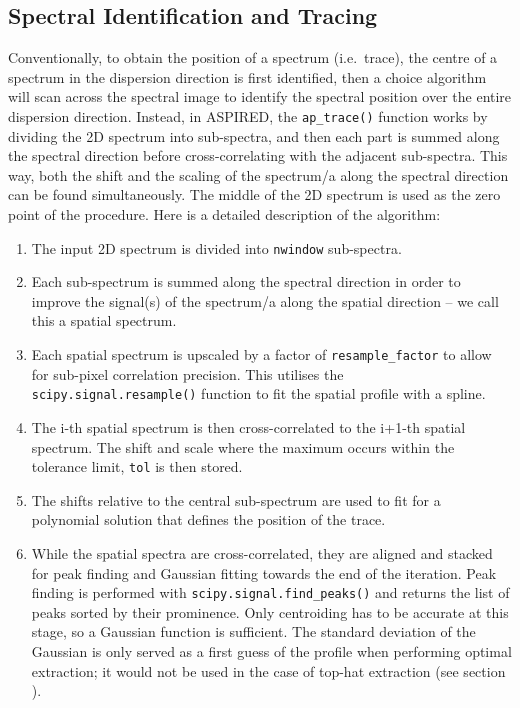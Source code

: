 \documentclass[fleqn,usenatbib]{mnras}
\begin{document}
\subsection{Spectral Identification and Tracing}
\label{sec:tracing}
Conventionally, to obtain the position of a spectrum (i.e.\ trace), the centre of
a spectrum in the dispersion direction is first identified, then a choice
algorithm will scan across the spectral image to identify the spectral position
over the entire dispersion direction. Instead, in \textsc{ASPIRED}, the \texttt{ap\_trace()}
function works by dividing the 2D spectrum into sub-spectra, and then each part
is summed along the spectral direction before cross-correlating with the adjacent
sub-spectra. This way, both the shift and the scaling of the spectrum/a along the
spectral direction can be found simultaneously. The middle of the
2D spectrum is used as the zero point of the procedure. Here is a
detailed description of the algorithm:
\begin{enumerate}
    \item
        The input 2D spectrum is divided into \texttt{nwindow}
        sub-spectra.
    \item
        Each sub-spectrum is summed along the spectral direction
        in order to improve the signal(s) of the spectrum/a along
        the spatial direction – we call this a spatial spectrum.
    \item
        Each spatial spectrum is upscaled by a factor of
        \texttt{resample\_factor} to allow for sub-pixel correlation
        precision. This utilises the \texttt{scipy.signal.resample()}
        function to fit the spatial profile with a spline.
    \item
        The i-th spatial spectrum is then cross-correlated to the i+1-th
        spatial spectrum. The shift and scale where the maximum
        occurs within the tolerance limit, \texttt{tol} is then stored.
    \item
        The shifts relative to the central sub-spectrum are used to
        fit for a polynomial solution that defines the position of
        the trace.
    \item
        While the spatial spectra are cross-correlated, they
        are aligned and stacked for peak finding and Gaussian fitting
        towards the end of the iteration. Peak finding is performed with
        \texttt{scipy.signal.find\_peaks()} and returns the list of
        peaks sorted by their prominence. Only centroiding has to be
        accurate at this stage, so a Gaussian function is sufficient.
        The standard deviation of the Gaussian is only served as a
        first guess of the profile when performing optimal extraction;
        it would not be used in the case of top-hat extraction (see
        section ).
\end{enumerate}
\end{document}
